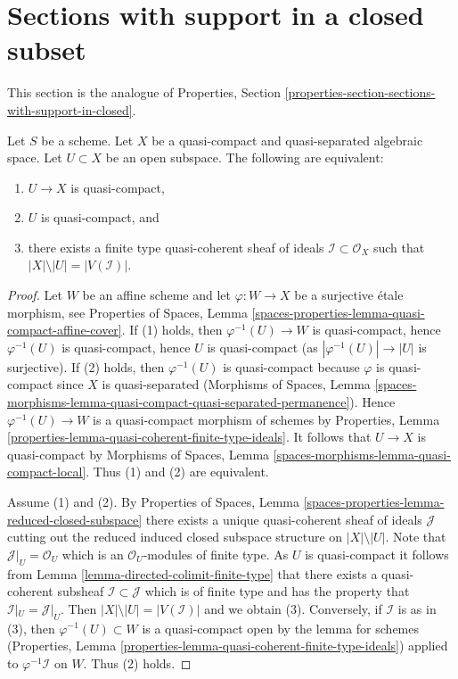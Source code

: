 \section{Sections with support in a closed subset}
\label{section-sections-with-support-in-closed}

\noindent
This section is the analogue of
Properties, Section \ref{properties-section-sections-with-support-in-closed}.

\begin{lemma}
\label{lemma-quasi-coherent-finite-type-ideals}
Let $S$ be a scheme.
Let $X$ be a quasi-compact and quasi-separated algebraic space.
Let $U \subset X$ be an open subspace. The following are equivalent:
\begin{enumerate}
\item $U \to X$ is quasi-compact,
\item $U$ is quasi-compact, and
\item there exists a finite type quasi-coherent sheaf of ideals
$\mathcal{I} \subset \mathcal{O}_X$ such that
$|X| \setminus |U| = |V(\mathcal{I})|$.
\end{enumerate}
\end{lemma}

\begin{proof}
Let $W$ be an affine scheme and let $\varphi : W \to X$ be a surjective
\'etale morphism, see Properties of Spaces, Lemma
\ref{spaces-properties-lemma-quasi-compact-affine-cover}.
If (1) holds, then $\varphi^{-1}(U) \to W$ is quasi-compact, hence
$\varphi^{-1}(U)$ is quasi-compact, hence $U$ is quasi-compact
(as $|\varphi^{-1}(U)| \to |U|$ is surjective). If (2) holds, then
$\varphi^{-1}(U)$ is quasi-compact because $\varphi$ is quasi-compact
since $X$ is quasi-separated (Morphisms of Spaces,
Lemma \ref{spaces-morphisms-lemma-quasi-compact-quasi-separated-permanence}).
Hence $\varphi^{-1}(U) \to W$ is a quasi-compact morphism of schemes by
Properties, Lemma \ref{properties-lemma-quasi-coherent-finite-type-ideals}.
It follows that $U \to X$ is quasi-compact by
Morphisms of Spaces, Lemma \ref{spaces-morphisms-lemma-quasi-compact-local}.
Thus (1) and (2) are equivalent.

\medskip\noindent
Assume (1) and (2). By
Properties of Spaces, Lemma
\ref{spaces-properties-lemma-reduced-closed-subspace} there exists
a unique quasi-coherent sheaf of ideals $\mathcal{J}$ cutting
out the reduced induced closed subspace structure on $|X| \setminus |U|$.
Note that $\mathcal{J}|_U = \mathcal{O}_U$ which is an
$\mathcal{O}_U$-modules of finite type.
As $U$ is quasi-compact it follows from
Lemma \ref{lemma-directed-colimit-finite-type}
that there exists a quasi-coherent subsheaf
$\mathcal{I} \subset \mathcal{J}$ which is of finite type
and has the property that $\mathcal{I}|_U = \mathcal{J}|_U$.
Then $|X| \setminus |U| = |V(\mathcal{I})|$ and we obtain (3). Conversely,
if $\mathcal{I}$ is as in (3), then $\varphi^{-1}(U) \subset W$
is a quasi-compact open by the lemma for schemes
(Properties, Lemma \ref{properties-lemma-quasi-coherent-finite-type-ideals})
applied to $\varphi^{-1}\mathcal{I}$ on $W$.
Thus (2) holds.
\end{proof}

